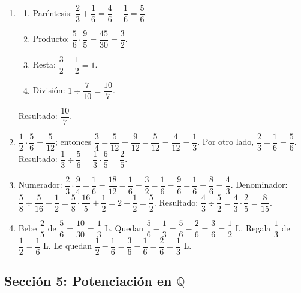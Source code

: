\documentclass[12pt, letterpaper]{article}
\begin{document}
  \begin{enumerate}[leftmargin=*, label=\textbf{\arabic*.}]
    \item
          \begin{enumerate}[label=\alph*)]
            \item Paréntesis: $\dfrac{2}{3} + \dfrac{1}{6} = \dfrac{4}{6} + \dfrac{1}{6} = \dfrac{5}{6}$.
            \item Producto: $\dfrac{5}{6} \cdot \dfrac{9}{5} = \dfrac{45}{30} = \dfrac{3}{2}$.
            \item Resta: $\dfrac{3}{2} - \dfrac{1}{2} = 1$.
            \item División: $1 \div \dfrac{7}{10} = \dfrac{10}{7}$.
          \end{enumerate}
          Resultado: $\dfrac{10}{7}$.

    \item $\dfrac{1}{2} \cdot \dfrac{5}{6} = \dfrac{5}{12}$; entonces $\dfrac{3}{4} - \dfrac{5}{12} = \dfrac{9}{12} - \dfrac{5}{12} = \dfrac{4}{12} = \dfrac{1}{3}$.
          Por otro lado, $\dfrac{2}{3} + \dfrac{1}{6} = \dfrac{5}{6}$.
          Resultado: $\dfrac{1}{3} \div \dfrac{5}{6} = \dfrac{1}{3} \cdot \dfrac{6}{5} = \dfrac{2}{5}$.

    \item Numerador: $\dfrac{2}{3} \cdot \dfrac{9}{4} - \dfrac{1}{6} = \dfrac{18}{12} - \dfrac{1}{6} = \dfrac{3}{2} - \dfrac{1}{6} = \dfrac{9}{6} - \dfrac{1}{6} = \dfrac{8}{6} = \dfrac{4}{3}$.
          Denominador: $\dfrac{5}{8} \div \dfrac{5}{16} + \dfrac{1}{2} = \dfrac{5}{8} \cdot \dfrac{16}{5} + \dfrac{1}{2} = 2 + \dfrac{1}{2} = \dfrac{5}{2}$.
          Resultado: $\dfrac{4}{3} \div \dfrac{5}{2} = \dfrac{4}{3} \cdot \dfrac{2}{5} = \dfrac{8}{15}$.

    \item Bebe $\dfrac{2}{5}$ de $\dfrac{5}{6} = \dfrac{10}{30} = \dfrac{1}{3}$ L. Quedan $\dfrac{5}{6} - \dfrac{1}{3} = \dfrac{5}{6} - \dfrac{2}{6} = \dfrac{3}{6} = \dfrac{1}{2}$ L.
          Regala $\dfrac{1}{3}$ de $\dfrac{1}{2} = \dfrac{1}{6}$ L. Le quedan $\dfrac{1}{2} - \dfrac{1}{6} = \dfrac{3}{6} - \dfrac{1}{6} = \dfrac{2}{6} = \dfrac{1}{3}$ L.
  \end{enumerate}

  \newpage

  \subsection*{Sección 5: Potenciación en $\mathbb{Q}$}
\end{document}
